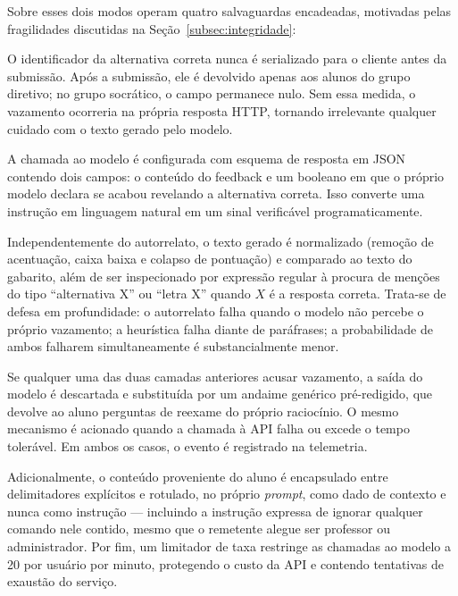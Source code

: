 \documentclass[10pt, a4paper, twocolumn]{article}
\begin{document}
Sobre esses dois modos operam quatro salvaguardas encadeadas, motivadas pelas
fragilidades discutidas na Seção~\ref{subsec:integridade}:

\begin{description}[style=nextline, leftmargin=0cm, itemsep=5pt]
    \item[\textbf{1. Retenção do gabarito no servidor}]
    O identificador da alternativa correta nunca é serializado para o cliente
    antes da submissão. Após a submissão, ele é devolvido apenas aos alunos do
    grupo diretivo; no grupo socrático, o campo permanece nulo. Sem essa medida,
    o vazamento ocorreria na própria resposta HTTP, tornando irrelevante
    qualquer cuidado com o texto gerado pelo modelo.

    \item[\textbf{2. Saída estruturada com autorrelato}]
    A chamada ao modelo é configurada com esquema de resposta em JSON contendo
    dois campos: o conteúdo do feedback e um booleano em que o próprio modelo
    declara se acabou revelando a alternativa correta. Isso converte uma
    instrução em linguagem natural em um sinal verificável programaticamente.

    \item[\textbf{3. Filtro heurístico de pós-processamento}]
    Independentemente do autorrelato, o texto gerado é normalizado (remoção de
    acentuação, caixa baixa e colapso de pontuação) e comparado ao texto do
    gabarito, além de ser inspecionado por expressão regular à procura de
    menções do tipo ``alternativa X'' ou ``letra X'' quando $X$ é a resposta
    correta. Trata-se de defesa em profundidade: o autorrelato falha quando o
    modelo não percebe o próprio vazamento; a heurística falha diante de
    paráfrases; a probabilidade de ambos falharem simultaneamente é
    substancialmente menor.

    \item[\textbf{4. \textit{Fallback} pedagógico}]
    Se qualquer uma das duas camadas anteriores acusar vazamento, a saída do
    modelo é descartada e substituída por um andaime genérico pré-redigido, que
    devolve ao aluno perguntas de reexame do próprio raciocínio. O mesmo
    mecanismo é acionado quando a chamada à API falha ou excede o tempo
    tolerável. Em ambos os casos, o evento é registrado na telemetria.
\end{description}

Adicionalmente, o conteúdo proveniente do aluno é encapsulado entre delimitadores
explícitos e rotulado, no próprio \textit{prompt}, como dado de contexto e nunca
como instrução --- incluindo a instrução expressa de ignorar qualquer comando
nele contido, mesmo que o remetente alegue ser professor ou administrador. Por
fim, um limitador de taxa restringe as chamadas ao modelo a 20 por usuário por
minuto, protegendo o custo da API e contendo tentativas de exaustão do serviço.
\end{document}
